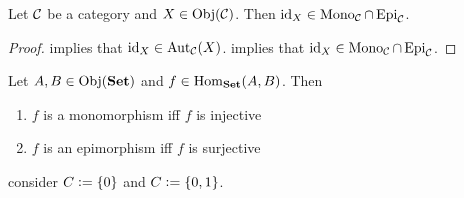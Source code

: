 \documentclass{book}
\begin{document}
	\begin{ex}
		Let $\mathcal{C}$ be a category and $X \in \operatorname{Obj}(\mathcal{C})$. Then $\operatorname{id}_X \in \operatorname{Mono}_{\mathcal{C}} \cap \operatorname{Epi}_{\mathcal{C}}$.
	\end{ex}
	
	\begin{proof}
		 implies that $\operatorname{id}_X \in \operatorname{Aut}_{\mathcal{C}}(X)$.  implies that $\operatorname{id}_X \in \operatorname{Mono}_{\mathcal{C}} \cap \operatorname{Epi}_{\mathcal{C}}$.
	\end{proof}
	
	\begin{ex} 
		Let $A, B \in \operatorname{Obj}(\text{\textbf{Set}})$ and $f \in \operatorname{Hom}_{\text{\textbf{Set}}}(A,B)$. Then 
		\begin{enumerate}
			\item $f$ is a monomorphism iff $f$ is injective
			\item $f$ is an epimorphism iff $f$ is surjective 
		\end{enumerate} 
		 consider $C \vcentcolon= \{0\}$ and $C \vcentcolon= \{0,1\}$.
	\end{ex}
	
\end{document}
